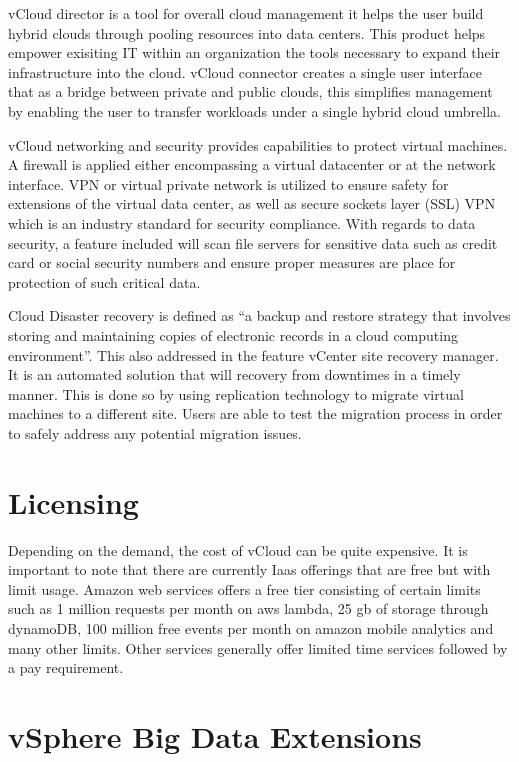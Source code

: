 \documentclass[9pt,twocolumn,twoside]{../../styles/osajnl}
\begin{document}
vCloud director is a tool for overall cloud management it
helps the user build hybrid clouds through pooling resources into data
centers.  This product helps empower exisiting IT within an
organization the tools necessary to expand their infrastructure into
the cloud. vCloud connector creates a single user interface that as a
bridge between private and public clouds, this simplifies management
by enabling the user to transfer workloads under a single hybrid cloud
umbrella.

vCloud networking and security provides capabilities to
protect virtual machines.  A firewall is applied either encompassing a
virtual datacenter or at the network interface.  VPN or virtual
private network is utilized to ensure safety for extensions of the
virtual data center, as well as secure sockets layer (SSL) VPN which
is an industry standard for security compliance. \cite{www-vmware3}
With regards to data security, a feature included will scan file
servers for sensitive data such as credit card or social security
numbers and ensure proper measures are place for protection of such
critical data.

Cloud Disaster recovery is defined as “a backup and
restore strategy that involves storing and maintaining copies of
electronic records in a cloud computing environment”. \cite{www-cloud}
This also addressed in the feature vCenter site recovery manager.  It
is an automated solution that will recovery from downtimes in a timely
manner.  This is done so by using replication technology to migrate
virtual machines to a different site.  Users are able to test the
migration process in order to safely address any potential migration
issues.

\section{Licensing}

Depending on the demand, the cost of vCloud can be quite expensive.
It is important to note that there are currently Iaas offerings that
are free but with limit usage.  Amazon web services offers a free tier
consisting of certain limits such as 1 million requests per month on
aws lambda, 25 gb of storage through dynamoDB, 100 million free events
per month on amazon mobile analytics and many other
limits. \cite{www-aws} Other services generally offer limited time
services followed by a pay requirement.

\section{vSphere Big Data Extensions}
\end{document}
